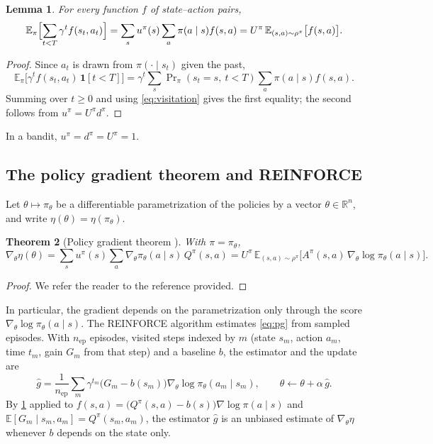 \documentclass[11pt,a4paper]{article}
\numberwithin{equation}{section}
\theoremstyle{plain}
\newtheorem{theorem}{Theorem}[section]
\newtheorem{lemma}[theorem]{Lemma}
\theoremstyle{definition}
\theoremstyle{remark}
\newcommand{\R}{\mathbb{R}}
\newcommand{\E}{\mathbb{E}}
\newcommand{\Ind}{\mathbf{1}}
\begin{document}
\begin{lemma}\label{lem:visitation}
For every function $f$ of state--action pairs,
\begin{equation}\label{eq:visitation-identity}
  \E_\pi\Bigl[\sum_{t<T}\gamma^{t}f(s_t,a_t)\Bigr]
  =\sum_{s}u^\pi(s)\sum_{a}\pi(a\mid s)f(s,a)
  =U^\pi\,\E_{(s,a)\sim\rho^\pi}\bigl[f(s,a)\bigr].
\end{equation}
\end{lemma}

\begin{proof}
Since $a_t$ is drawn from $\pi(\cdot\mid s_t)$ given the past,
\[
  \E_\pi\bigl[\gamma^{t}f(s_t,a_t)\,\Ind[t<T]\bigr]
  =\gamma^{t}\sum_{s}\Pr\nolimits_\pi(s_t=s,\ t<T)\sum_{a}\pi(a\mid s)f(s,a).
\]
Summing over $t\ge0$ and using \eqref{eq:visitation} gives the first equality; the second follows from
$u^\pi=U^\pi d^\pi$. \qedhere
\end{proof}

In a bandit, $u^\pi=d^\pi=U^\pi=1$.

\subsection{The policy gradient theorem and REINFORCE}

Let $\theta\mapsto\pi_\theta$ be a differentiable parametrization of the policies by a vector
$\theta\in\R^n$, and write $\eta(\theta)=\eta(\pi_\theta)$.

\begin{theorem}[Policy gradient theorem \cite{sutton2000,sutton2018}]\label{thm:pg}
With $\pi=\pi_\theta$,
\begin{equation}\label{eq:pg}
  \nabla_\theta\eta(\theta)
  =\sum_{s}u^\pi(s)\sum_{a}\nabla_\theta\pi_\theta(a\mid s)\,Q^\pi(s,a)
  =U^\pi\,\E_{(s,a)\sim\rho^\pi}\bigl[A^\pi(s,a)\,\nabla_\theta\log\pi_\theta(a\mid s)\bigr].
\end{equation}
\end{theorem}

\begin{proof} We refer the reader to the reference provided.
\end{proof}

In particular, the gradient depends on the parametrization only through the score
$\nabla_\theta\log\pi_\theta(a\mid s)$. The REINFORCE algorithm \cite{williams1992} estimates
\eqref{eq:pg} from sampled episodes. With $n_{\mathrm{ep}}$ episodes, visited steps indexed by $m$
(state $s_m$, action $a_m$, time $t_m$, gain $G_m$ from that step) and a baseline $b$, the estimator and
the update are
\begin{equation}\label{eq:reinforce}
  \hat g=\frac1{n_{\mathrm{ep}}}\sum_{m}\gamma^{t_m}\bigl(G_m-b(s_m)\bigr)\nabla_\theta\log\pi_\theta(a_m\mid s_m),
  \qquad
  \theta\leftarrow\theta+\alpha\,\hat g .
\end{equation}
By \cref{lem:visitation} applied to $f(s,a)=\bigl(Q^\pi(s,a)-b(s)\bigr)\nabla\log\pi(a\mid s)$ and
$\E[G_m\mid s_m,a_m]=Q^\pi(s_m,a_m)$, the estimator $\hat g$ is an unbiased estimate of $\nabla_\theta\eta$ whenever
$b$ depends on the state only.
\end{document}
